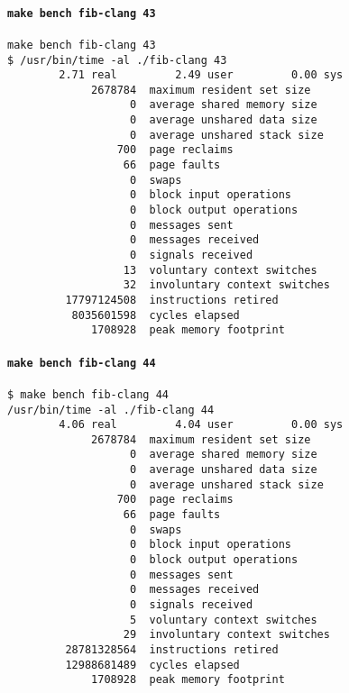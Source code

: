 \documentclass{article}
\begin{document}
\paragraph{\lstinline!make bench fib-clang 43!}
\begin{lstlisting}[language=none]
make bench fib-clang 43
$ /usr/bin/time -al ./fib-clang 43
        2.71 real         2.49 user         0.00 sys
             2678784  maximum resident set size
                   0  average shared memory size
                   0  average unshared data size
                   0  average unshared stack size
                 700  page reclaims
                  66  page faults
                   0  swaps
                   0  block input operations
                   0  block output operations
                   0  messages sent
                   0  messages received
                   0  signals received
                  13  voluntary context switches
                  32  involuntary context switches
         17797124508  instructions retired
          8035601598  cycles elapsed
             1708928  peak memory footprint
\end{lstlisting}

\paragraph{\lstinline!make bench fib-clang 44!}
\begin{lstlisting}[language=none]
$ make bench fib-clang 44
/usr/bin/time -al ./fib-clang 44
        4.06 real         4.04 user         0.00 sys
             2678784  maximum resident set size
                   0  average shared memory size
                   0  average unshared data size
                   0  average unshared stack size
                 700  page reclaims
                  66  page faults
                   0  swaps
                   0  block input operations
                   0  block output operations
                   0  messages sent
                   0  messages received
                   0  signals received
                   5  voluntary context switches
                  29  involuntary context switches
         28781328564  instructions retired
         12988681489  cycles elapsed
             1708928  peak memory footprint
\end{lstlisting}
\end{document}
